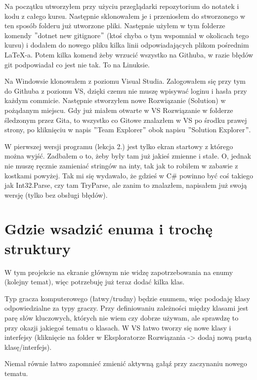 \documentclass[10pt]{article}
\begin{document}
Na początku utworzyłem przy użyciu przeglądarki repozytorium do notatek i kodu z całego kursu. Następnie sklonowałem je i przeniosłem do stworzonego w ten sposób folderu już utworzone pliki. Następnie użyłem w tym folderze komendy $"$dotnet new gitignore$"$ (ktoś chyba o tym wspomniał w okolicach tego kursu) i dodałem do nowego pliku kilka linii odpowiadających plikom pośrednim LaTeX-a. Potem kilka komend żeby wrzucić wszystko na Githuba, w razie błędów git podpowiadał co jest nie tak. To na Linuksie.

Na Windowsie klonowałem z poziomu Visual Studia. Zalogowałem się przy tym do Githuba z poziomu VS, dzięki czemu nie muszę wpisywać loginu i hasła przy każdym commicie. Następnie stworzyłem nowe Rozwiązanie (Solution) w pożądanym miejscu. Gdy już miałem otwarte w VS Rozwiązanie w folderze śledzonym przez Gita, to wszystko co Gitowe znalazłem w VS po środku prawej strony, po kliknięciu w napis $"$Team Explorer$"$ obok napisu $"$Solution Explorer$"$.

W pierwszej wersji programu (lekcja 2.) jest tylko ekran startowy z którego można wyjść. Zadbałem o to, żeby były tam już jakieś zmienne i stałe. O, jednak nie muszę ręcznie zamieniać stringów na inty, tak jak to robiłem w zabawie z kostkami powyżej. Tak mi się wydawało, że gdzieś w C\# powinno być coś takiego jak Int32.Parse, czy tam TryParse, ale zanim to znalazłem, napisałem już swoją wersję (tylko bez obsługi błędów).

\section{Gdzie wsadzić enuma i trochę struktury}
W tym projekcie na ekranie głównym nie widzę zapotrzebowania na enumy (kolejny temat), więc potrzebuję już teraz dodać kilka klas.

Typ gracza komputerowego (łatwy/trudny) będzie enumem, więc pododaję klasy odpowiedzialne za typy graczy. Przy definiowaniu zależności między klasami jest parę słów kluczowych, których nie wiem czy dobrze używam, ale sprawdzę to przy okazji jakiegoś tematu o klasach. W VS łatwo tworzy się nowe klasy i interfejsy (kliknięcie na folder w Eksploratorze Rozwiązania -> dodaj nową pustą klasę/interfejs).

Niemal równie łatwo zapomnieć zmienić aktywną gałąź przy zaczynaniu nowego tematu.
\end{document}
